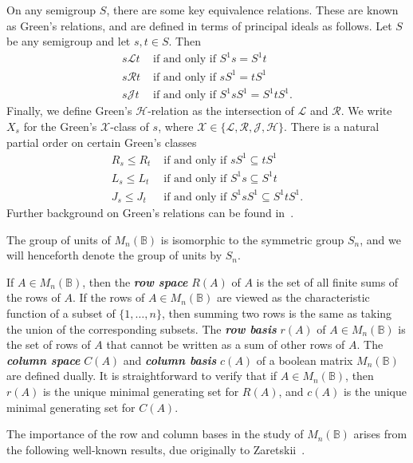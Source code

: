\documentclass[11pt]{article}
\newcommand{\defn}[1]{\textbf{\textit{#1}}}
\numberwithin{equation}{section}
\newcommand{\B}{\mathbb{B}}
\newcommand{\Bn}{M_n(\B)}
\renewcommand{\L}{\mathscr{L}}
\newcommand{\R}{\mathscr{R}}
\newcommand{\J}{\mathscr{J}}
\renewcommand{\H}{\mathscr{H}}
\begin{document}
On any semigroup $S$, there are some key equivalence relations. These are known
as Green's relations, and are defined in terms of principal ideals as follows.
Let $S$ be any semigroup and let $s, t \in S$. Then
\begin{align*}
  s \L t &\text{ if and only if } S^1 s = S^1 t \\
  s \R t &\text{ if and only if } s S^1 = t S^1 \\
  s \J t &\text{ if and only if } S^1 s S^1 = S^1 t S^1.
\end{align*}
Finally, we define Green's $\H$-relation as the intersection of $\L$ and $\R$.
We write $X_s$ for the Green's $\mathcal{X}$-class of $s$, where
$\mathcal{X} \in \{\L, \R, \J, \H\}$.
There is a natural partial order on certain Green's classes
\begin{align*}
  R_s \leq R_t &\text{ if and only if } sS^1 \subseteq tS^1 \\
  L_s \leq L_t &\text{ if and only if } S^1s \subseteq S^1t \\
  J_s \leq J_t &\text{ if and only if } S^1 s S^1 \subseteq S^1 t S^1.
\end{align*}
Further background on Green's relations can be found in~\cite{Howie1995aa}.


The group of units of $\Bn$ is isomorphic to the symmetric group $S_n$, and we
will henceforth denote the group of units by $S_n$.

If $A \in \Bn$, then the \defn{row space} $R(A)$ of $A$ is the set of 
all finite sums of the rows of $A$. If the rows of $A\in \Bn$ are viewed as
the characteristic function of a subset of $\{1, \ldots, n\}$, then summing two
rows is the same as taking the union of the corresponding subsets.  The
\defn{row basis} $r(A)$ of $A\in \Bn$ is the set of rows of $A$ that cannot be
written as a sum of other rows of $A$. The \defn{column space}
$C(A)$ and \defn{column basis} $c(A)$ of a boolean matrix $\Bn$ are defined
dually. It is straightforward to verify that if $A \in \Bn$, then $r(A)$ is the
unique minimal generating set for $R(A)$, and $c(A)$ is the unique minimal
generating set for $C(A)$. 


The importance of the row and column bases in the study of $\Bn$ arises from the
following well-known results, due originally to
Zaretskii~\cite{Zaretskii1963aa}. 
\end{document}
